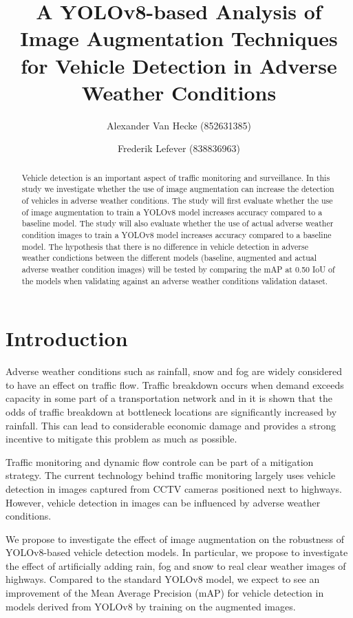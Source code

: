 \documentclass[]{article}
\title{
	A YOLOv8-based Analysis of Image Augmentation Techniques for Vehicle Detection in Adverse Weather Conditions}
\author{
		Alexander Van Hecke \small(852631385) \and 
		Frederik Lefever    \small(838836963)}
\begin{document}
\maketitle

\begin{abstract}
	Vehicle detection is an important aspect of traffic monitoring and surveillance.  In this study we investigate whether the use of image augmentation can increase the detection of vehicles in adverse weather conditions.  The study will first evaluate whether the use of image augmentation to train a YOLO\small{v8} model increases accuracy compared to a baseline model.  The study will also evaluate whether the use of actual adverse weather condition images to train a YOLO\small{v8} model increases accuracy compared to a baseline model.  The hypothesis that there is no difference in vehicle detection in adverse weather condictions between the different models (baseline, augmented and actual adverse weather condition images) will be tested by comparing the mAP at 0.50 IoU of the models when validating against an adverse weather conditions validation dataset.
\end{abstract}

\section{Introduction}

	Adverse weather conditions such as rainfall, snow and fog are widely considered to have an effect on traffic flow. Traffic breakdown occurs when demand exceeds capacity in some part of a transportation network and in \cite{stralenInfluenceAdverseWeather2015} it is shown that the odds of traffic breakdown at bottleneck locations are significantly increased by rainfall.  This can lead to considerable economic damage and provides a strong incentive to mitigate this problem as much as possible.
	
	Traffic monitoring and dynamic flow controle can be part of a mitigation strategy. The current technology behind traffic monitoring largely uses vehicle detection in images captured from CCTV cameras positioned next to highways. However, vehicle detection in images can be influenced by adverse weather conditions.
	
	We propose to investigate the effect of image augmentation on the robustness of YOLO{\small v8}-based vehicle detection models. In particular, we propose to investigate the effect of artificially adding rain, fog and snow to real clear weather images of highways. Compared to the standard YOLO{\small v8} model, we expect to see an improvement of the Mean Average Precision (mAP) for vehicle detection in models derived from YOLO{\small v8} by training on the augmented images.
	
\end{document}

